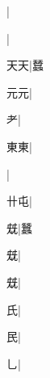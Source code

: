 \begin{multicols}{2}
{{}|{}\par
{}|{}\par
{\cjk{}{\cnsym{}　}天天}|{\cjk{}蠺}\par
{\cjk{}{\cnsym{}　}元元}|{}\par
{\cjk{}{\cnsym{}　}{\cnsym{}　}耂}|{}\par
{\cjk{}{\cnsym{}　}東東}|{}\par
{}|{}\par
{\cjk{}{\cnsym{}　}卄屯}|{}\par
{\cjk{}{\cnsym{}　}{\cnsym{}　}兓}|{\cjk{}蠶}\par
{兓}|{}\par
{兓}|{}\par
{\cjk{}{\cnsym{}　}{\cnsym{}　}氏}|{}\par
{\cjk{}{\cnsym{}　}{\cnsym{}　}民}|{}\par
{乚}|{}\par
}
\end{multicols}

